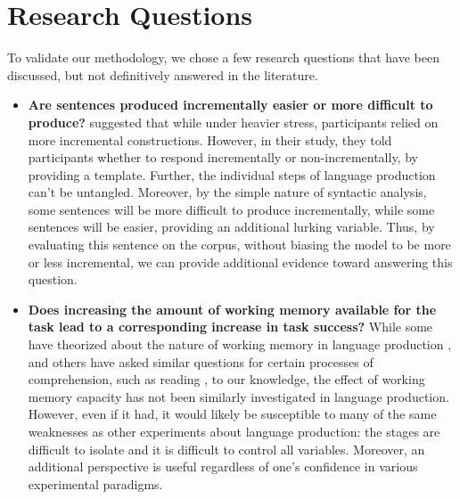 \section{Research Questions}
To validate our methodology, we chose a few research questions that have been discussed, but not definitively answered in the literature.

\begin{itemize}
	\item{ \textbf{Are sentences produced incrementally easier or more difficult to produce?} \citet{sums-incr} suggested that while under heavier stress, participants relied on more incremental constructions. However, in their study, they told participants whether to respond incrementally or non-incrementally, by providing a template. Further, the individual steps of language production can't be untangled. Moreover, by the simple nature of syntactic analysis, some sentences will be more difficult to produce incrementally, while some sentences will be easier, providing an additional lurking variable. Thus, by evaluating this sentence on the corpus, without biasing the model to be more or less incremental, we can provide additional evidence toward answering this question. }
	\item{ \textbf{Does increasing the amount of working memory available for the task lead to a corresponding increase in task success?} While some have theorized about the nature of working memory in language production \citep{vwm}, and others have asked similar questions for certain processes of comprehension, such as reading \citep{wmread}, to our knowledge, the effect of working memory capacity has not been similarly investigated in language production. However, even if it had, it would likely be susceptible to many of the same weaknesses as other experiments about language production: the stages are difficult to isolate and it is difficult to control all variables. Moreover, an additional perspective is useful regardless of one's confidence in various experimental paradigms.}
\end{itemize}